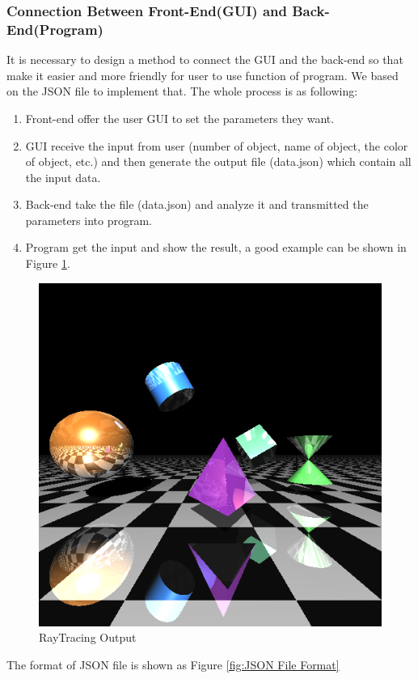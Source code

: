 \documentclass[a4paper, 12pt]{article}
\begin{document}
\subsubsection{Connection Between Front-End(GUI) and Back-End(Program)}
It is necessary to design a method to connect the GUI and the back-end so that make it easier and more friendly for user to use function of program. We based on the JSON file to implement that. The whole process is as following:
\begin{enumerate}
\item Front-end offer the user GUI to set the parameters they want.
\item GUI receive the input from user (number of object, name of object, the color of object, etc.) and then generate the output file (data.json) which contain all the input data.
\item Back-end take the file (data.json) and analyze it and transmitted the parameters into program.
\item Program get the input and show the result, a good example can be shown in Figure \ref{fig:RayTracing Output}.
\end{enumerate}

\begin{figure}[H]
\centering
\includegraphics[width=0.8\linewidth]{Shape_all_objects.png}
\caption{RayTracing Output}
\label{fig:RayTracing Output}
\end{figure} 

The format of JSON file is shown as Figure \ref{fig:JSON File Format}
\end{document}
